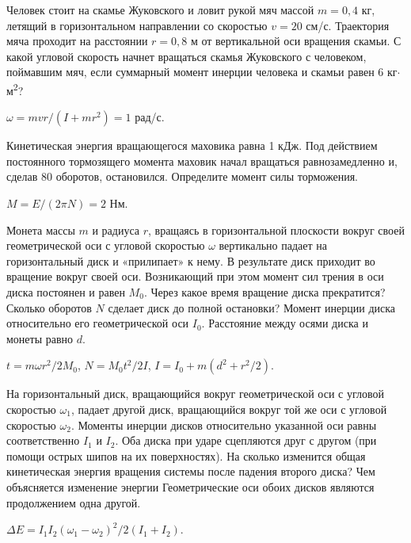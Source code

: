 \begin{ex} %
Человек стоит на скамье Жуковского и ловит рукой мяч массой $m = 0,4$ кг, летящий в горизонтальном направлении со скоростью $v = 20$ см/с. Траектория мяча проходит на расстоянии $r=0,8$ м от вертикальной оси вращения скамьи. С какой угловой скорость начнет вращаться скамья Жуковского с человеком, поймавшим мяч, если суммарный момент инерции человека и скамьи равен 6 кг$\cdot$м\textsuperscript{2}?
\begin{ans}
$\omega = mvr/(I+mr^2) = 1$ рад/с.
\end{ans}
\end{ex}	

\begin{ex} %
Кинетическая энергия вращающегося маховика равна 1 кДж. Под действием постоянного тормозящего момента маховик начал вращаться равнозамедленно и, сделав 80 оборотов, остановился. Определите момент силы торможения.
\begin{ans}
$M = E / (2 \pi N) = 2$ Нм.
\end{ans}
\end{ex}	

\begin{ex} %
Монета массы $m$ и радиуса $r$, вращаясь в горизонтальной плоскости вокруг своей геометрической оси с угловой скоростью $\omega$ вертикально падает на горизонтальный диск и «прилипает» к нему. В результате диск приходит во вращение вокруг своей оси. Возникающий при этом момент сил трения в оси диска постоянен и равен $M_0$. Через какое время вращение диска прекратится? Сколько оборотов $N$ сделает диск до полной остановки? Момент инерции диска относительно его геометрической оси $I_0$. Расстояние между осями диска и монеты равно $d$.
\begin{ans}
$t = m\omega r^2 / 2M_0$, $N = M_0t^2/2I$, $I = I_0 + m(d^2 + r^2/2)$.
\end{ans}
\end{ex}	

\begin{ex} %
На горизонтальный диск, вращающийся вокруг геометрической оси с угловой скоростью $\omega_1$, падает другой диск, вращающийся вокруг той же оси с угловой скоростью $\omega_2$. Моменты инерции дисков относительно указанной оси равны соответственно $I_1$ и $I_2$. Оба диска при ударе сцепляются друг с другом (при помощи острых шипов на их поверхностях). На сколько изменится общая кинетическая энергия вращения системы после падения второго диска? Чем объясняется изменение энергии Геометрические оси обоих дисков являются продолжением одна другой.
\begin{ans}
$\Delta E = I_1 I_2 (\omega_1 - \omega_2)^2/ 2(I_1 + I_2)$.
\end{ans}
\end{ex}	

